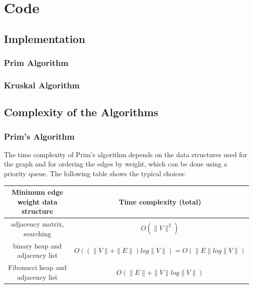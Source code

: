 \documentclass[a4paper, 12pt]{article}
\begin{document}
\newpage

\section{Code}

\subsection{Implementation}

\subsubsection*{Prim Algorithm}



\subsubsection*{Kruskal Algorithm}


\newpage

\subsection{Complexity of the Algorithms}

\subsubsection*{Prim’s Algorithm}

The time complexity of Prim's algorithm depends on the data structures used for the graph and for ordering the edges by weight, which can be done using a priority queue. The following table shows the typical choices:

\begin{center}
      \begin{tabular}{|c|c|}
            \hline
            Minimum edge weight data structure & Time complexity (total)                       \\
            \hline
            adjacency matrix, searching        & $O(\|V\|^2)$                                  \\
            \hline
            binary heap and adjacency list     & $O((\|V\|+\|E\|)log\|V\|) = O(\|E\|log\|V\|)$ \\
            \hline
            Fibonacci heap and adjacency list  & $O(\|E\|+\|V\|log\|V\|)$                      \\
            \hline
      \end{tabular}
\end{center}
\end{document}
